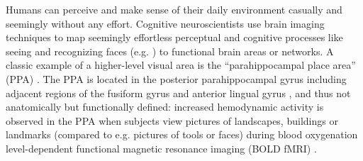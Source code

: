 \documentclass[english]{article}
\begin{document}


Humans can perceive and make sense of their daily environment casually and
seemingly without any effort. Cognitive neuroscientists use brain imaging
techniques to map seemingly effortless perceptual and cognitive processes like
seeing and recognizing faces (e.g. \citep{kanwisher1997ffa}) to functional brain
areas or networks.
A classic example of a higher-level visual area is the ``parahippocampal place
area'' (PPA) \citep{epstein1998ppa, epstein1999parahippocampal}.
The PPA is located in the posterior parahippocampal gyrus including adjacent
regions of the fusiform gyrus and anterior lingual gyrus
\citep{epstein2008parahippocampal}, and thus not anatomically but functionally
defined:
increased hemodynamic activity is observed in the PPA when subjects view
pictures of landscapes, buildings or landmarks (compared to e.g. pictures of
tools or faces) during blood oxygenation level-dependent functional magnetic
resonance imaging (BOLD fMRI) \citep{aguirre1998area, epstein2014neural,
epstein1998ppa}.
\end{document}
